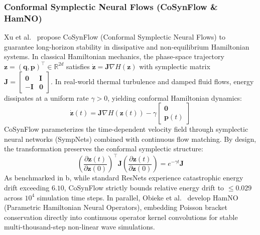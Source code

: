 \subsubsection{Conformal Symplectic Neural Flows (CoSynFlow \& HamNO)}
Xu et al.~\cite{Xu2026CoSynFlow} propose CoSynFlow (Conformal Symplectic Neural Flows) to guarantee long-horizon stability in dissipative and non-equilibrium Hamiltonian systems. In classical Hamiltonian mechanics, the phase-space trajectory $\mathbf{z} = (\mathbf{q}, \mathbf{p})^\top \in \mathbb{R}^{2d}$ satisfies $\dot{\mathbf{z}} = \mathbf{J} \nabla H(\mathbf{z})$ with symplectic matrix $\mathbf{J} = \begin{bmatrix} \mathbf{0} & \mathbf{I} \\ -\mathbf{I} & \mathbf{0} \end{bmatrix}$. In real-world thermal turbulence and damped fluid flows, energy dissipates at a uniform rate $\gamma > 0$, yielding conformal Hamiltonian dynamics:
\begin{equation}
    \dot{\mathbf{z}}(t) = \mathbf{J} \nabla H(\mathbf{z}(t)) - \gamma \begin{bmatrix} \mathbf{0} \\ \mathbf{p}(t) \end{bmatrix}
\end{equation}
CoSynFlow parameterizes the time-dependent velocity field through symplectic neural networks (SympNets) combined with continuous flow matching. By design, the transformation preserves the conformal symplectic structure:
\begin{equation}
    \left(\frac{\partial \mathbf{z}(t)}{\partial \mathbf{z}(0)}\right)^\top \mathbf{J} \left(\frac{\partial \mathbf{z}(t)}{\partial \mathbf{z}(0)}\right) = e^{-\gamma t} \mathbf{J}
\end{equation}
As benchmarked in b, while standard ResNets experience catastrophic energy drift exceeding $6.10$, CoSynFlow strictly bounds relative energy drift to $\leq 0.029$ across $10^4$ simulation time steps. In parallel, Obieke et al.~\cite{Obieke2026HamNO} develop HamNO (Parametric Hamiltonian Neural Operators), embedding Poisson bracket conservation directly into continuous operator kernel convolutions for stable multi-thousand-step non-linear wave simulations.

